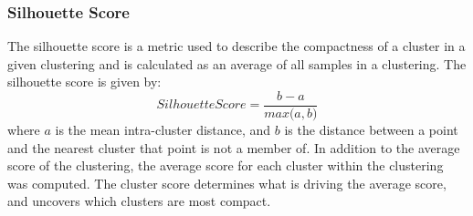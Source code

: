 \subsubsection{Silhouette Score}
The silhouette score is a metric used to describe the compactness of a cluster in a given clustering and is calculated as an average of all samples in a clustering.  
The silhouette score is given by:
\begin{equation}
\label{eq:ss}
Silhouette Score = \frac{b - a}{\textit{max}\big(a, b\big)}
\end{equation}
where $a$ is the mean intra-cluster distance, and $b$ is the distance between a point and the nearest cluster that point is not a member of.
In addition to the average score of the clustering, the average score for each cluster within the clustering was computed.
The cluster score determines what is driving the average score, and uncovers which clusters are most compact.
